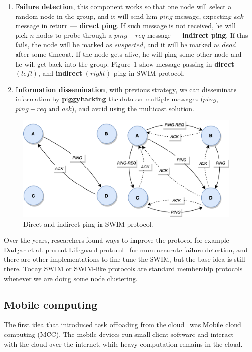 \begin{enumerate}[start=1,label={(\bfseries \arabic*)}]
	\item \textbf{Failure detection}, this component works so that one node will select a random node in the group, and it will send him $ping$ message, expecting $ack$ message in return --- \textbf{direct ping}. If such message is not received, he will pick $n$ nodes to probe through a $ping-req$ message --- \textbf{indirect ping}. If this fails, the node will be marked as $suspected$, and it will be marked as $dead$ after some timeout. If the node gets alive, he will ping some other node and he will get back into the group. Figure~\ref{fig:fig15} show message passing in \textbf{direct} $(left)$, and \textbf{indirect} $(right)$ ping in SWIM protocol.
	\item \textbf{Information dissemination}, with previous strategy, we can disseminate information by \textbf{piggybacking} the data on multiple messages ($ping$, $ping-req$ and $ack$), and avoid using the multicast solution.
\end{enumerate}

\begin{figure}[H]
	\begin{center}
		\includegraphics[scale=0.7]{images/Figure15.png}
	\end{center}
	\vspace{-0.6cm}
	\caption{Direct and indirect ping in SWIM protocol.}
	\label{fig:fig15}
\end{figure}

Over the years, researchers found ways to improve the protocol for example Dadgar et al. present Lifeguard protocol~\cite{DadgarPC18} for more accurate failure detection, and there are other implementations to fine-tune the SWIM, but the base idea is still there. Today SWIM or SWIM-like protocols are standard membership protocols whenever we are doing some node clustering.
%
%
\subsection{Mobile computing}\label{sec:mobile_computing}
%
The first idea that introduced task offloading from the cloud~\cite{FernandoLR13, LinLJL19} was Mobile cloud computing (MCC). The mobile devices run small client software and interact with the cloud over the internet, while heavy computation remains in the cloud. 

